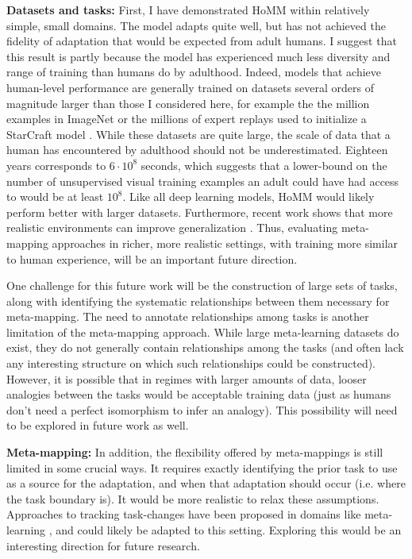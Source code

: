 \textbf{Datasets and tasks:} First, I have demonstrated HoMM within relatively simple, small domains. The model adapts quite well, but has not achieved the fidelity of adaptation that would be expected from adult humans. I suggest that this result is partly because the model has experienced much less diversity and range of training than humans do by adulthood. Indeed, models that achieve human-level performance are generally trained on datasets several orders of magnitude larger than those I considered here, for example the the million examples in ImageNet \citep{Deng2009} or the millions of expert replays used to initialize a StarCraft model \citep{Vinyals2019}. While these datasets are quite large, the scale of data that a human has encountered by adulthood should not be underestimated. Eighteen years corresponds to \(6 \cdot 10^8\) seconds, which suggests that a lower-bound on the number of unsupervised visual training examples an adult could have had access to would be at least \(10^8\). Like all deep learning models, HoMM would likely perform better with larger datasets. Furthermore, recent work shows that more realistic environments can improve generalization \citep{Hill2019a}. Thus, evaluating meta-mapping approaches in richer, more realistic settings, with training more similar to human experience, will be an important future direction. \par

One challenge for this future work will be the construction of large sets of tasks, along with identifying the systematic relationships between them necessary for meta-mapping. The need to annotate relationships among tasks is another limitation of the meta-mapping approach. While large meta-learning datasets do exist, they do not generally contain relationships among the tasks (and often lack any interesting structure on which such relationships could be constructed). However, it is possible that in regimes with larger amounts of data, looser analogies between the tasks would be acceptable training data (just as humans don't need a perfect isomorphism to infer an analogy). This possibility will need to be explored in future work as well. \par

\textbf{Meta-mapping:} In addition, the flexibility offered by meta-mappings is still limited in some crucial ways. It requires exactly identifying the prior task to use as a source for the adaptation, and when that adaptation should occur (i.e. where the task boundary is). It would be more realistic to relax these assumptions. Approaches to tracking task-changes have been proposed in domains like meta-learning \citep[e.g.][]{Nagabandi2019}, and could likely be adapted to this setting. Exploring this would be an interesting direction for future research. \par

